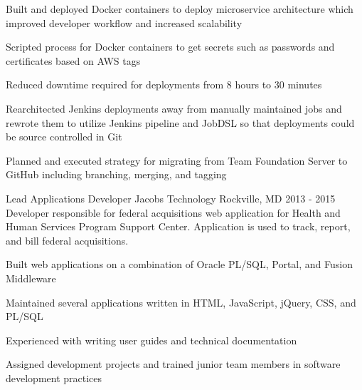 \begin{cventries}
{\begin{cvitems}
\begin{itemize}
        \end{itemize}
        \item {Built and deployed Docker containers to deploy microservice architecture which improved developer workflow and increased scalability}
        \item {Scripted process for Docker containers to get secrets such as passwords and certificates based on AWS tags}
        \item {Reduced downtime required for deployments from 8 hours to 30 minutes}
        \item {Rearchitected Jenkins deployments away from manually maintained jobs and rewrote them to utilize Jenkins pipeline and JobDSL so that deployments could be source controlled in Git}
        \item {Planned and executed strategy for migrating from Team Foundation Server to GitHub including branching, merging, and tagging}
      \end{cvitems}
    }


  \cventrysix
    {Lead Applications Developer} %
    {Jacobs Technology} %
    {Rockville, MD} %
    {2013 - 2015} %
    {Developer responsible for federal acquisitions web application for Health and Human Services Program Support Center. Application is used to track, report, and bill federal acquisitions.} %
    {
      \begin{cvitems} %
        \item {Built web applications on a combination of Oracle PL/SQL, Portal, and Fusion Middleware}
        \item {Maintained several applications written in HTML, JavaScript, jQuery, CSS, and PL/SQL}
        \item {Experienced with writing user guides and technical documentation}
        \item {Assigned development projects and trained junior team members in software development practices}
      \end{cvitems}
    }


\end{cventries}
